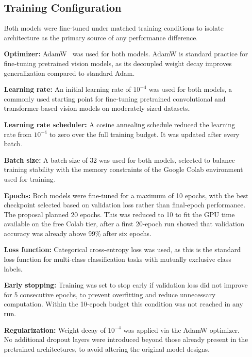 \documentclass[conference]{IEEEtran}
\begin{document}
\subsection{Training Configuration}

Both models were fine-tuned under matched training conditions to isolate architecture as the primary source of any performance difference.

\textbf{Optimizer:} AdamW~\cite{loshchilov2019adamw} was used for both models. AdamW is standard practice for fine-tuning pretrained vision models, as its decoupled weight decay improves generalization compared to standard Adam.

\textbf{Learning rate:} An initial learning rate of $10^{-4}$ was used for both models, a commonly used starting point for fine-tuning pretrained convolutional and transformer-based vision models on moderately sized datasets.

\textbf{Learning rate scheduler:} A cosine annealing schedule reduced the learning rate from $10^{-4}$ to zero over the full training budget. It was updated after every batch.

\textbf{Batch size:} A batch size of 32 was used for both models, selected to balance training stability with the memory constraints of the Google Colab environment used for training.

\textbf{Epochs:} Both models were fine-tuned for a maximum of 10 epochs, with the best checkpoint selected based on validation loss rather than final-epoch performance. The proposal planned 20 epochs. This was reduced to 10 to fit the GPU time available on the free Colab tier, after a first 20-epoch run showed that validation accuracy was already above 99\% after six epochs.

\textbf{Loss function:} Categorical cross-entropy loss was used, as this is the standard loss function for multi-class classification tasks with mutually exclusive class labels.

\textbf{Early stopping:} Training was set to stop early if validation loss did not improve for 5 consecutive epochs, to prevent overfitting and reduce unnecessary computation. Within the 10-epoch budget this condition was not reached in any run.

\textbf{Regularization:} Weight decay of $10^{-4}$ was applied via the AdamW optimizer. No additional dropout layers were introduced beyond those already present in the pretrained architectures, to avoid altering the original model designs.
\end{document}
